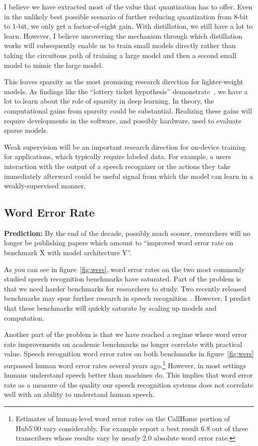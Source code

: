 I believe we have extracted most of the value that quantization has to offer.
Even in the unlikely best possible scenario of further reducing quantization
from 8-bit to 1-bit, we only get a factor-of-eight gain. With distillation, we
still have a lot to learn. However, I believe uncovering the mechanism through
which distillation works will subsequently enable us to train small models
directly rather than taking the circuitous path of training a large model and
then a second small model to mimic the large model.

This leaves sparsity as the most promising research direction for
lighter-weight models. As findings like the ``lottery ticket hypothesis''
demonstrate~\citep{frankle2018lottery}, we have a lot to learn about the role
of sparsity in deep learning. In theory, the computational gains from sparsity
could be substantial. Realizing these gains will require developments in the
software, and possibly hardware, used to evaluate sparse models.

Weak supervision will be an important research direction for on-device training
for applications, which typically require labeled data. For example, a users
interaction with the output of a speech recognizer or the actions they take
immediately afterward could be useful signal from which the model can learn in
a weakly-supervised manner.

\subsection{Word Error Rate}
\label{sec:wer}

{\bf Prediction:} By the end of the decade, possibly much sooner, researchers
will no longer be publishing papers which amount to ``improved word error rate
on benchmark X with model architecture Y''.

As you can see in figure~\ref{fig:wers}, word error rates on the two most
commonly studied speech recognition benchmarks have saturated. Part of the
problem is that we need harder benchmarks for researchers to study.  Two
recently released benchmarks may spur further research in speech
recognition~\citep{chen2021gigaspeech, galvez2021people}. However, I predict
that these benchmarks will quickly saturate by scaling up models and
computation.

Another part of the problem is that we have reached a regime where word error
rate improvements on academic benchmarks no longer correlate with practical
value. Speech recognition word error rates on both benchmarks in
figure~\ref{fig:wers} surpassed human word error rates several years
ago.\footnote{Estimates of human-level word error rates on the CallHome portion
of Hub5'00 vary considerably. For example \citet{saon2017english} report a best
result 6.8 out of three transcribers whose results vary by nearly 2.0 absolute
word error rate.} However, in most settings humans understand speech better
than machines do. This implies that word error rate as a measure of the quality
our speech recognition systems does not correlate well with an ability to
understand human speech.

